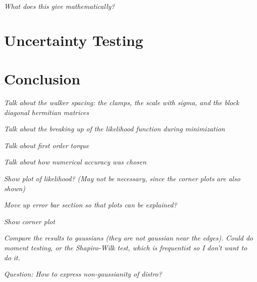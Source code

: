 \documentclass[linenumbers]{aastex631}
\newcommand{\jtd}[1]{{\color{red}\textit{#1}}}
\begin{document}
\jtd{What does this give mathematically?}



\section{Uncertainty Testing}


\section{Conclusion}


\jtd{Talk about the walker spacing: the clamps, the scale with sigma, and the block diagonal hermitian matrices}

\jtd{Talk about the breaking up of the likelihood function during minimization}

\jtd{Talk about first order torque}

\jtd{Talk about how numerical accuracy was chosen}

\jtd{Show plot of likelihood? (May not be necessary, since the corner plots are also shown)}

\jtd{Move up error bar section so that plots can be explained?}

\jtd{Show corner plot}

\jtd{Compare the results to gaussians (they are not gaussian near the edges). Could do moment testing, or the Shapiro-Wilk test, which is frequentist so I don't want to do it.}

\jtd{Question: How to express non-gaussianity of distro?}

\vspace{5mm}



\appendix
\end{document}
